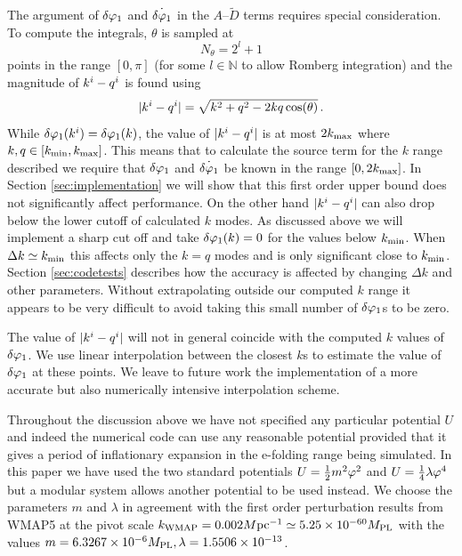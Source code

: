 The argument of $\delta\varphi_{1}$ and $\dot{\delta\varphi_{1}}$ in the $A$--$\tilde{D}$ terms requires
special consideration. 
To compute the integrals, $\theta$ is sampled at 
% 
\begin{equation}
\label{eq:nthetadefn}
N_\theta = 2^l + 1
\end{equation}
% 
points in the range
$[0,\pi]$ (for some $l\in \mathbb{N}$ to allow Romberg integration) and the magnitude of
$k^i-q^i$
is
found using
% 
\begin{equation}
 |k^i -q^i| = \sqrt{k^2 + q^2 - 2kq\cos(\theta)}\,.
\end{equation}
%
While $\delta\varphi_{1}(k^i)=\delta\varphi_{1}(k)$, the value of $|k^i-q^i|$ is at most
$2k_{\mathrm{max}}$ where $k,q \in [k_{\mathrm{min}},k_{\mathrm{max}}]$. This means that to calculate
the source term for the $k$ range described we require that $\delta\varphi_{1}$
and $\dot{\delta\varphi_{1}}$ be known in the range $[0, 2k_{\mathrm{max}}]$. In
Section \ref{sec:implementation} we will 
show that this first order upper bound does not significantly affect
performance. On the other hand $|k^i-q^i|$ can also drop below the
lower cutoff of calculated $k$ modes. As discussed above we will implement a sharp cut off and
take $\delta\varphi_{1}(k)=0$ for the values below
$k_{\mathrm{min}}$. When $\Delta k \simeq k_{\mathrm{min}}$ this affects only the $k=q$ modes and
is only significant close to $k_{\mathrm{min}}$. Section \ref{sec:codetests}
describes how the accuracy is affected by changing $\Delta k$ and
other parameters. Without extrapolating outside our computed $k$ range
it appears to be very difficult to avoid taking this small number of
$\delta\varphi_{1}$s to be zero.


The value of $|k^i-q^i|$ will not in general coincide with the computed $k$
values of $\delta\varphi_{1}$. We use linear interpolation between the closest $k$s to
estimate the value of $\delta\varphi_{1}$ at these points. We leave to future work the
implementation of a more
accurate but also numerically intensive interpolation scheme.


Throughout the discussion above we have not specified any particular
potential $U$ and indeed the numerical code can use any reasonable
potential provided that it gives a period of inflationary expansion in
the e-folding range being simulated. In this paper we have used the two
standard potentials $U=\frac{1}{2} m^2 \varphi^2$ and $U=\frac{1}{4}\lambda\varphi^4$
but a modular system allows another potential to be used instead. We
choose the parameters $m$ and $\lambda$ in agreement with the first
order perturbation results from WMAP5 at the pivot scale
$k_\mathrm{WMAP}=0.002M \mathrm{pc}^{-1} \simeq5.25\times10^{- 60} M_{\mathrm{PL}}$ with the values $m=6.3267\times10^{-6}
M_{\mathrm{PL}}, \lambda=1.5506\times10^{-13}$.


